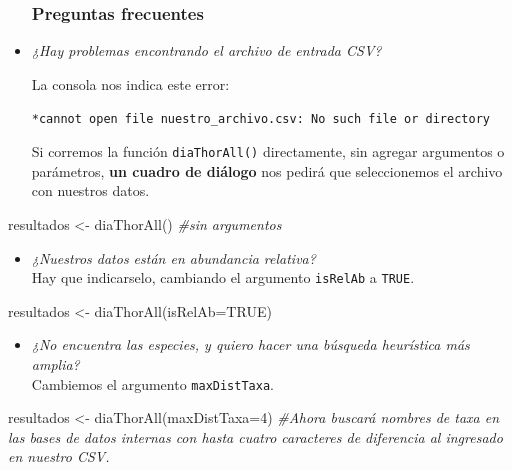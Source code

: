 \documentclass[
]{book}
\newenvironment{Shaded}{\begin{snugshade}}{\end{snugshade}}
\newcommand{\AttributeTok}[1]{\textcolor[rgb]{0.77,0.63,0.00}{#1}}
\newcommand{\CommentTok}[1]{\textcolor[rgb]{0.56,0.35,0.01}{\textit{#1}}}
\newcommand{\ConstantTok}[1]{\textcolor[rgb]{0.00,0.00,0.00}{#1}}
\newcommand{\DecValTok}[1]{\textcolor[rgb]{0.00,0.00,0.81}{#1}}
\newcommand{\FunctionTok}[1]{\textcolor[rgb]{0.00,0.00,0.00}{#1}}
\newcommand{\NormalTok}[1]{#1}
\newcommand{\OtherTok}[1]{\textcolor[rgb]{0.56,0.35,0.01}{#1}}
\providecommand{\tightlist}{%
  \setlength{\itemsep}{0pt}\setlength{\parskip}{0pt}}
\begin{document}
\begin{itemize}
  \hypertarget{preguntas-frecuentes}{%
  \subsubsection{Preguntas frecuentes}\label{preguntas-frecuentes}}
\item
  \emph{¿Hay problemas encontrando el archivo de entrada CSV?}

  La consola nos indica este error:

  \texttt{*cannot\ open\ file\ \textquotesingle{}nuestro\_archivo.csv\textquotesingle{}:\ No\ such\ file\ or\ directory}

  Si corremos la función \texttt{diaThorAll()} directamente, sin agregar argumentos o parámetros, \textbf{un cuadro de diálogo} nos pedirá que seleccionemos el archivo con nuestros datos.
\end{itemize}

\begin{Shaded}
\begin{Highlighting}[]
\NormalTok{resultados }\OtherTok{\textless{}{-}} \FunctionTok{diaThorAll}\NormalTok{() }\CommentTok{\#sin argumentos}
\end{Highlighting}
\end{Shaded}

\begin{itemize}
\tightlist
\item
  \emph{¿Nuestros datos están en abundancia relativa?}\\
  Hay que indicarselo, cambiando el argumento \texttt{isRelAb} a \texttt{TRUE}.
\end{itemize}

\begin{Shaded}
\begin{Highlighting}[]
\NormalTok{resultados }\OtherTok{\textless{}{-}} \FunctionTok{diaThorAll}\NormalTok{(}\AttributeTok{isRelAb=}\ConstantTok{TRUE}\NormalTok{)}
\end{Highlighting}
\end{Shaded}

\begin{itemize}
\tightlist
\item
  \emph{¿No encuentra las especies, y quiero hacer una búsqueda heurística más amplia?}\\
  Cambiemos el argumento \texttt{maxDistTaxa}.
\end{itemize}

\begin{Shaded}
\begin{Highlighting}[]
\NormalTok{resultados }\OtherTok{\textless{}{-}} \FunctionTok{diaThorAll}\NormalTok{(}\AttributeTok{maxDistTaxa=}\DecValTok{4}\NormalTok{) }\CommentTok{\#Ahora buscará nombres de taxa en las bases de datos internas con hasta cuatro caracteres de diferencia al ingresado en nuestro CSV.}
\end{Highlighting}
\end{Shaded}
\end{document}

